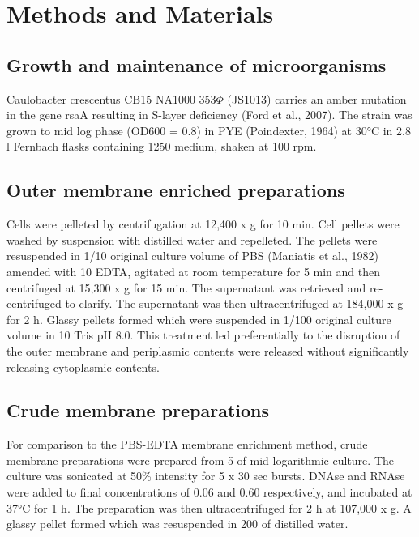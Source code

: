 \section{Methods and Materials}
\label{sec:porin_methods}
\subsection{Growth and maintenance of microorganisms} 
\label{sub:porin_growth}
Caulobacter crescentus CB15 NA1000 353$\Phi$ (JS1013) carries an amber mutation in the gene rsaA resulting in S-layer deficiency (Ford et al., 2007). The strain was grown to mid log phase (\ac{OD600} = 0.8) in \ac{PYE} (Poindexter, 1964) at 30\si{\degreeCelsius} in 2.8 \si{\litre} Fernbach flasks containing 1250 \millilitre medium, shaken at 100 rpm.

\subsection{Outer membrane enriched preparations}
\label{sub:porin_omp_prep}
Cells were pelleted by centrifugation at 12,400 x g for 10 min. Cell pellets were washed by suspension with distilled water and repelleted. The pellets were resuspended in 1/10 original culture volume of \ac{PBS} (Maniatis et al., 1982) amended with 10 \millimolar{} \ac{EDTA}, agitated at room temperature for 5 min and then centrifuged at 15,300 x g for 15 min. The supernatant was retrieved and re-centrifuged to clarify. The supernatant was then ultracentrifuged at 184,000 x g for 2 h. Glassy pellets formed which were suspended in 1/100 original culture volume in 10 \millimolar Tris pH 8.0. This treatment led preferentially to the disruption of the outer membrane and periplasmic contents were released without significantly releasing cytoplasmic contents.

\subsection{Crude membrane preparations}
\label{sub:porin_crude_preps}
For comparison to the \ac{PBS}-\ac{EDTA} membrane enrichment method, crude membrane preparations were prepared from 5 \millilitre of mid logarithmic culture. The culture was sonicated at 50\% intensity for 5 x 30 sec bursts. DNAse and RNAse were added to final concentrations of 0.06 \mgperml and 0.60 \mgperml respectively, and incubated at 37\si{\degreeCelsius} for 1 h. The preparation was then ultracentrifuged for 2 h at 107,000 x g. A glassy pellet formed which was resuspended in 200 \microlitre of distilled water.

